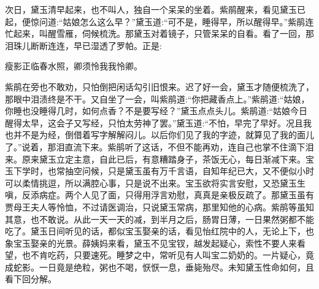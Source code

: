 \begin{parag}
    次日，黛玉清早起来，也不叫人，独自一个呆呆的坐着。紫鹃醒来，看见黛玉已起，便惊问道:“姑娘怎么这么早？”黛玉道:“可不是，睡得早，所以醒得早。”紫鹃连忙起来，叫醒雪雁，伺候梳洗。那黛玉对着镜子，只管呆呆的自看。看了一回，那泪珠儿断断连连，早已湿透了罗帕。正是:
\end{parag}


\begin{poem}
    \begin{pl}
        瘦影正临春水照，卿须怜我我怜卿。
    \end{pl}
\end{poem}


\begin{parag}
    紫鹃在旁也不敢劝，只怕倒把闲话勾引旧恨来。迟了好一会，黛玉才随便梳洗了，那眼中泪渍终是不干。又自坐了一会，叫紫鹃道:“你把藏香点上。”紫鹃道:“姑娘，你睡也没睡得几时，如何点香？不是要写经？”黛玉点点头儿。紫鹃道:“姑娘今日醒得太早，这会子又写经，只怕太劳神了罢。”黛玉道:“不怕，早完了早好。况且我也并不是为经，倒借着写字解解闷儿。以后你们见了我的字迹，就算见了我的面儿了。”说着，那泪直流下来。紫鹃听了这话，不但不能再劝，连自己也掌不住滴下泪来。原来黛玉立定主意，自此已后，有意糟踏身子，茶饭无心，每日渐减下来。宝玉下学时，也常抽空问候，只是黛玉虽有万千言语，自知年纪已大，又不便似小时可以柔情挑逗，所以满腔心事，只是说不出来。宝玉欲将实言安慰，又恐黛玉生嗔，反添病症。两个人见了面，只得用浮言劝慰，真真是亲极反疏了。那黛玉虽有贾母王夫人等怜恤，不过请医调治，只说黛玉常病，那里知他的心病。紫鹃等虽知其意，也不敢说。从此一天一天的减，到半月之后，肠胃日薄，一日果然粥都不能吃了。黛玉日间听见的话，都似宝玉娶亲的话，看见怡红院中的人，无论上下，也象宝玉娶亲的光景。薛姨妈来看，黛玉不见宝钗，越发起疑心，索性不要人来看望，也不肯吃药，只要速死。睡梦之中，常听见有人叫宝二奶奶的。一片疑心，竟成蛇影。一日竟是绝粒，粥也不喝，恹恹一息，垂毙殆尽。未知黛玉性命如何，且看下回分解。
\end{parag}